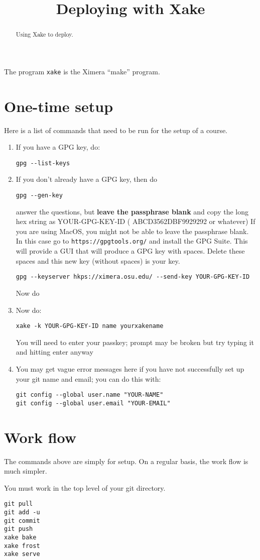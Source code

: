 \documentclass{ximera}
\title{Deploying with Xake}
\begin{document}
\begin{abstract}
Using Xake to deploy.
\end{abstract}
\maketitle

The program \verb|xake| is the Ximera ``make'' program.

\section{One-time setup}

Here is a list of commands that need to be run for the setup of a course. 

\begin{enumerate}
\item If you have a GPG key, do:
\begin{verbatim}
gpg --list-keys
\end{verbatim}
\item If you don’t already have a GPG key, then do
\begin{verbatim}
gpg --gen-key
\end{verbatim}
answer the questions, but \textbf{leave the passphrase blank} and copy
the long hex string as YOUR-GPG-KEY-ID ( ABCD3562DBF9929292 or
whatever) If you are using MacOS, you might not be able to leave the
passphrase blank. In this case go to \verb|https://gpgtools.org/| and
install the GPG Suite.  This will provide a GUI that will produce a
GPG key with spaces. Delete these spaces and this new key (without
spaces) is your key.

\begin{verbatim}
gpg --keyserver hkps://ximera.osu.edu/ --send-key YOUR-GPG-KEY-ID
\end{verbatim}
Now do
\item Now do: 
\begin{verbatim}
xake -k YOUR-GPG-KEY-ID name yourxakename
\end{verbatim}
You will need to enter your passkey; prompt may be broken but try typing it and hitting enter anyway

\item You may get vague error messages here if you have not successfully set up your git name and email; you can do this with:
\begin{verbatim}
git config --global user.name "YOUR-NAME"
git config --global user.email "YOUR-EMAIL"
\end{verbatim}
\end{enumerate}


\section{Work flow}

The commands above are simply for setup. On a regular basis, the work flow is much simpler.

You must work in the top level of your git directory.
\begin{verbatim}
git pull
git add -u
git commit
git push
xake bake
xake frost
xake serve
\end{verbatim}




  
\end{document}
